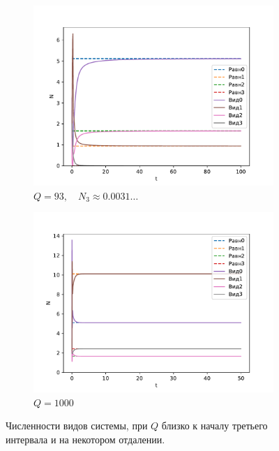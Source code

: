 \begin{figure}[H]
    \centering
    \begin{subfigure}[t]{.45\linewidth}
        \centering
        \includegraphics[width=\textwidth]{pictures/cycle/exp1_Q93.pdf}
        \caption{\(Q = 93, \quad N_3 \approx 0.0031\ldots \)}
    \end{subfigure}
    \begin{subfigure}[t]{.45\linewidth}
            \centering
            \includegraphics[width=\textwidth]{pictures/cycle/exp1_Q1000.pdf}
            \caption{\(Q = 1000\)}
        \end{subfigure}
    \caption{Численности видов системы, при \(Q\) близко к началу третьего интервала и на некотором отдалении.}  \label{fig:cycle_exp1_q3}
\end{figure}

